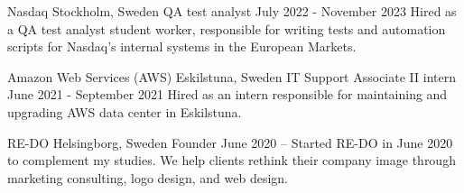 \documentclass[../main.tex]{subfiles}
\begin{document}
\company
    {Nasdaq}
    {Stockholm, Sweden}
\titles
    {QA test analyst}
    {July 2022 - November 2023}
    {Hired as a QA test analyst student worker, responsible for writing tests and automation scripts for Nasdaq's internal systems in the European Markets.}

\company
    {Amazon Web Services (AWS)}
    {Eskilstuna, Sweden}
\titles
    {IT Support Associate II intern}
    {June 2021 - September 2021}
    {Hired as an intern responsible for maintaining and upgrading AWS data center in Eskilstuna.}

\company
    {RE-DO}
    {Helsingborg, Sweden}
\titles
    {Founder}
    {June 2020 –} 
    {Started RE-DO in June 2020 to complement my studies. We help clients rethink their company image through marketing consulting, logo design, and web design.}
\end{document}
